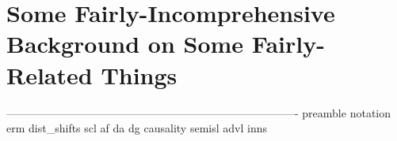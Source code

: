 \chapter{
  Some Fairly-Incomprehensive Background on Some Fairly-Related Things
}\label{ch:background}
-------------------------------------------------------------------------------
{preamble}
{notation}
{erm}
{dist_shifts}
{scl}
{af}
{da}
{dg}
{causality}
{semisl}
{advl}
{inns}


